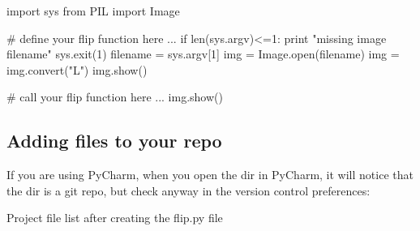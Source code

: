 \documentclass[titlepage]{tufte-book}
\begin{document}
\begin{pyverbatim}
import sys
from PIL import Image

# define your flip function here
...
if len(sys.argv)<=1:
	print "missing image filename"
	sys.exit(1)
filename = sys.argv[1]
img = Image.open(filename)
img = img.convert("L")
img.show()

# call your flip function here
...
img.show()
\end{pyverbatim}

\subsection{Adding files to your repo}

If you are using PyCharm, when you open the dir in PyCharm, it will notice that the dir is a git repo, but check anyway in the version control preferences:


\begin{marginfigure}
\begin{center}
\end{center}
\caption{Project file list after creating the flip.py file}
\label{fliplist}
\end{marginfigure}
\end{document}
